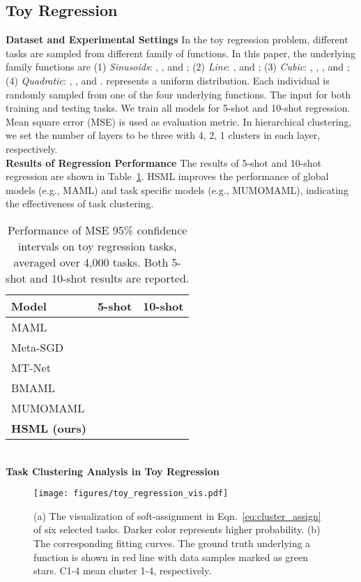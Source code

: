 \documentclass{article}
\begin{document}
\subsection{Toy Regression}
\label{sec:toy_res}
\textbf{Dataset and Experimental Settings}
In the toy regression problem, different tasks are sampled from different family of functions. In this paper, the underlying family functions are (1) \emph{Sinusoids}: , ,  and ; (2) \emph{Line}: ,  and ; (3) \emph{Cubic}: , , ,  and ; (4) \emph{Quadratic}: , ,  and .  represents a uniform distribution. Each individual is randomly sampled from one of the four underlying functions. The input  for both training and testing tasks. We train all models for 5-shot and 10-shot regression. Mean square error (MSE) is used as evaluation metric. In hierarchical clustering, we set the number of layers to be three with 4, 2, 1 clusters in each layer, respectively.
\\
\textbf{Results of Regression Performance}
The results of 5-shot and 10-shot regression are shown in Table~\ref{tab:1dregression_group}. HSML improves the performance of global models (e.g., MAML) and task specific models (e.g., MUMOMAML), indicating the effectiveness of task clustering. 
\begin{table}[h]
\small
\caption{Performance of MSE  95\% confidence intervals on toy regression tasks, averaged over 4,000 tasks. Both 5-shot and 10-shot results are reported.}
\label{tab:1dregression_group}
\begin{center}
\begin{tabular}{l|c|c}
\hline
Model & 5-shot &  10-shot \\\hline
MAML    &  & \\
Meta-SGD &  &  \\
MT-Net &  & \\
BMAML &  & \\
MUMOMAML &  & \\\midrule
\textbf{HSML (ours)}    &  &  \\\hline
\end{tabular}
\end{center}
\end{table}
\\
\textbf{Task Clustering Analysis in Toy Regression}
\begin{figure}[h]
	\centering
 	\texttt{[image: figures/toy\_regression\_vis.pdf]}
	\caption{(a) The visualization of soft-assignment in Eqn.~\eqref{eq:cluster_assign} of six selected tasks. Darker color represents higher probability. (b) The corresponding fitting curves. 
	The ground truth underlying a function is shown in red line with data samples marked as green stars. C1-4 mean cluster 1-4, respectively.} 
	\label{fig:vis_sync}
\end{figure}
\end{document}
